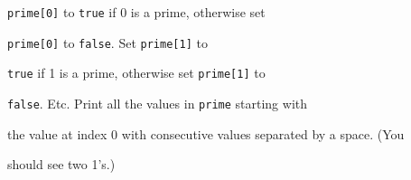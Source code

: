 \texttt{prime[0]} to \texttt{true} if 0 is a prime, otherwise set

\texttt{prime[0]} to \texttt{false}. Set \texttt{prime[1]} to

\texttt{true} if 1 is a prime, otherwise set \texttt{prime[1]} to

\texttt{false}. Etc. Print all the values in \texttt{prime} starting with

the value at index 0 with consecutive values separated by a space. (You

should see two 1's.)

